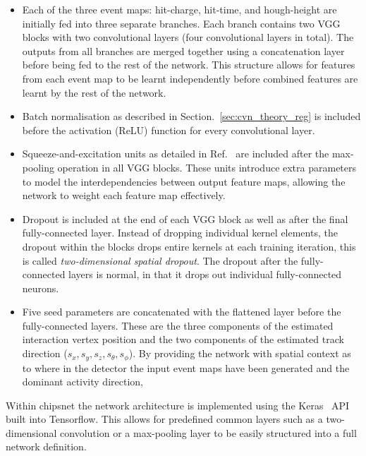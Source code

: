 \begin{itemize}
    \item Each of the three event maps: hit-charge, hit-time, and hough-height are initially fed
          into three separate branches. Each branch contains two VGG blocks with two convolutional
          layers (four convolutional layers in total). The outputs from all branches are merged
          together using a concatenation layer before being fed to the rest of the network. This
          structure allows for features from each event map to be learnt independently before
          combined features are learnt by the rest of the network.

    \item Batch normalisation as described in Section.~\ref{sec:cvn_theory_reg} is included before
          the activation (ReLU) function for every convolutional layer.

    \item Squeeze-and-excitation units as detailed in Ref.~\cite{hu2018} are included after the
          max-pooling operation in all VGG blocks. These units introduce extra parameters to model
          the interdependencies between output feature maps, allowing the network to weight each
          feature map effectively.

    \item Dropout is included at the end of each VGG block as well as after the final
          fully-connected layer. Instead of dropping individual kernel elements, the dropout
          within the blocks drops entire kernels at each training iteration, this is called
          \emph{two-dimensional spatial dropout}. The dropout after the fully-connected layers is
          normal, in that it drops out individual fully-connected neurons.

    \item Five seed parameters are concatenated with the flattened layer before the
          fully-connected layers. These are the three components of the estimated interaction
          vertex position and the two components of the estimated track direction ($s_{x},s_{y},
              s_{z},s_{\theta},s_{\phi}$). By providing the network with spatial context as to where
          in the detector the input event maps have been generated and the dominant activity
          direction,
\end{itemize}

Within chipsnet the network architecture is implemented using the Keras~\cite{chollet2015} API
built into Tensorflow. This allows for predefined common layers such as a two-dimensional
convolution or a max-pooling layer to be easily structured into a full network definition.

